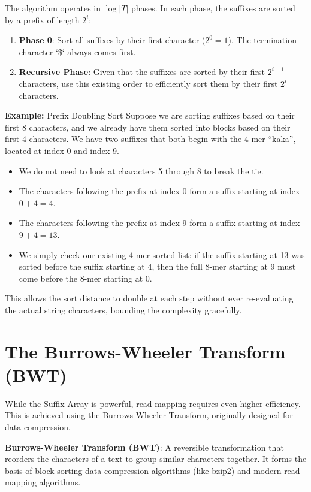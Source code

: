 The algorithm operates in \( \log |T| \) phases. In each phase, the suffixes are sorted by a prefix of length \( 2^i \):
\begin{enumerate}
    \item \textbf{Phase 0}: Sort all suffixes by their first character (\( 2^0 = 1 \)). The termination character `\$` always comes first.
    \item \textbf{Recursive Phase}: Given that the suffixes are sorted by their first \( 2^{i-1} \) characters, use this existing order to efficiently sort them by their first \( 2^i \) characters.
\end{enumerate}

\textbf{Example:} Prefix Doubling Sort
Suppose we are sorting suffixes based on their first 8 characters, and we already have them sorted into blocks based on their first 4 characters. We have two suffixes that both begin with the 4-mer ``kaka'', located at index 0 and index 9.
\begin{itemize}
    \item We do not need to look at characters 5 through 8 to break the tie.
    \item The characters following the prefix at index 0 form a suffix starting at index \( 0 + 4 = 4 \).
    \item The characters following the prefix at index 9 form a suffix starting at index \( 9 + 4 = 13 \).
    \item We simply check our existing 4-mer sorted list: if the suffix starting at 13 was sorted before the suffix starting at 4, then the full 8-mer starting at 9 must come before the 8-mer starting at 0.
\end{itemize}
This allows the sort distance to double at each step without ever re-evaluating the actual string characters, bounding the complexity gracefully.

\section{The Burrows-Wheeler Transform (BWT)}

While the Suffix Array is powerful, read mapping requires even higher efficiency. This is achieved using the Burrows-Wheeler Transform, originally designed for data compression.

\begin{important}
  \textbf{Burrows-Wheeler Transform (BWT)}: A reversible transformation that reorders the characters of a text to group similar characters together. It forms the basis of block-sorting data compression algorithms (like bzip2) and modern read mapping algorithms.
\end{important}

